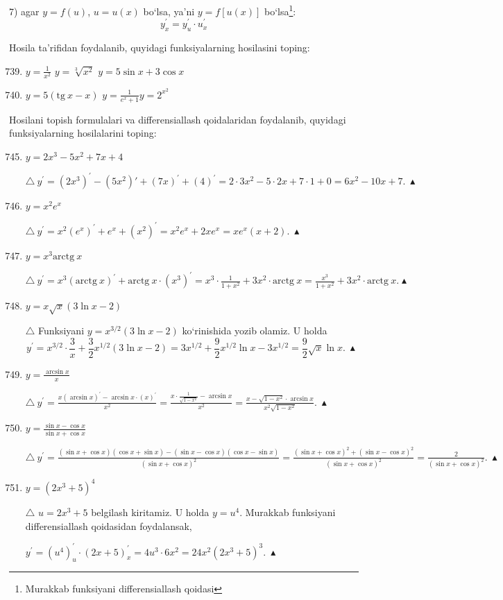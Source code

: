  7) agar $y=f(u)$, $u=u(x)$ bo`lsa, ya'ni $y=f[u(x)]$ bo`lsa\footnote{Murakkab funksiyani differensiallash qoidasi}:
 $$y_x^\prime=y_u^\prime\cdot u_x^\prime$$
 
 
 Hosila ta'rifidan foydalanib, quyidagi funksiyalarning hosilasini toping:
 \begin{enumerate}\setcounter{enumi}{738}
 	\item $y=\frac{1}{x^{2}}$ \inlineitem $y=\sqrt[3]{x^{2}}$ \inlineitem $y=5\sin x+3\cos x$
 	\item $y=5(\textrm{tg}\ x-x)$ \inlineitem $y=\frac{1}{e^x+1}$\inlineitem $y=2^{x^{2}}$	
 \end{enumerate}

Hosilani topish formulalari va differensiallash qoidalaridan foydalanib, quyidagi funksiyalarning hosilalarini toping:
\begin{enumerate}\setcounter{enumi}{744}
	\item $y=2x^3-5x^2+7x+4$
	
	$\triangle\ y^\prime=(2x^3)^\prime-(5x^2)\prime+(7x)^\prime+(4)^\prime=2\cdot3x^2-5\cdot2x+7\cdot1+0=6x^2-10x+7.\ \blacktriangle$
	
	\item $y=x^{2}e^x$
	
	$\triangle\ y^\prime=x^2(e^x)^\prime+e^x+(x^2)^\prime=x^2e^x+2xe^x=xe^x(x+2).\ \blacktriangle$
	
	\item $y=x^3\textrm{arctg}\ x$
	
	$\triangle\ y^\prime=x^3(\textrm{arctg}\ x)^\prime+\textrm{arctg}\ x\cdot (x^3)^\prime=x^3\cdot\frac{1}{1+x^2}+3x^2\cdot\textrm{arctg}\ x=\frac{x^3}{1+x^2}+3x^2\cdot\textrm{arctg}\ x. \blacktriangle$
	
	\item $y=x\sqrt{x}(3\ln {x}-2)$
	
	$\triangle$ Funksiyani $y=x^{3/2}(3\ln x-2)$ ko`rinishida yozib olamiz. U holda $$y^\prime=x^{3/2}\cdot\frac{3}{x}+\frac{3}{2}x^{1/2}(3\ln x-2)=3x^{1/2}+\frac{9}{2}x^{1/2}\ln x-3x^{1/2}=\frac{9}{2}\sqrt{x}\ln x.\ \blacktriangle$$
	
	\item $y=\frac{\arcsin x}{x}$
	
	$\triangle\ y^\prime=\frac{x(\arcsin x)^\prime-\arcsin x\cdot(x)^\prime}{x^{2}}=\frac{x\cdot\frac{1}{\sqrt{1-x^2}}-\arcsin x}{x^2}=\frac{x-\sqrt{1-x^2}\cdot\arcsin x}{x^2\sqrt{1-x^2}}.\ \blacktriangle$
	
	\item $y=\frac{\sin x-\cos x}{\sin x+\cos x}$
	
	$\triangle\ y^\prime=\frac{(\sin x+\cos x)(\cos x+\sin x)-(\sin x-\cos x)(\cos x-\sin x)}{(\sin x+\cos x)^2}=\frac{(\sin x+\cos x)^2+(\sin x-\cos x)^2}{(\sin x+\cos x)^2}=
	\frac{2}{(\sin x+\cos x)^2}.\ \blacktriangle $
	
	\item $y=(2x^3+5)^4$
	
	$\triangle$ $u=2x^3+5$ belgilash kiritamiz. U holda $y=u^4$. Murakkab funksiyani differensiallash qoidasidan foydalansak,
	
	$y^\prime=(u^4)^\prime_u\cdot(2x+5)^\prime_x=4u^3\cdot6x^2=24x^2(2x^3+5)^3.\ \blacktriangle$
\end{enumerate}	

